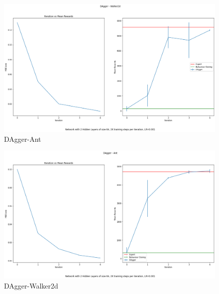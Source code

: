 \documentclass[11pt]{article}
\begin{document}
    \begin{figure}
        \centering
        \includegraphics[scale=0.3]{q2.2.1_plots}
        \caption{DAgger-Ant}
    \end{figure}

    \begin{figure}
        \centering
        \includegraphics[scale=0.3]{q2.2.2_plots}
        \caption{DAgger-Walker2d}
    \end{figure}
\end{document}
